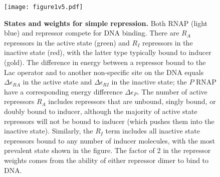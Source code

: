 \begin{figure}[h]
	\centering \texttt{[image: figure1v5.pdf]}
	\caption{{\bf States and weights for simple repression. } Both RNAP (light blue)
		and repressor compete for DNA binding. There are $R_A$ repressors in the active
		state (green) and $R_I$ repressors in the inactive state (red), with the latter
		type typically bound to inducer (gold). The difference in energy between a
		repressor bound to the Lac operator and to another non-specific site on the DNA
		equals $\Delta\epsilon_{RA}$ in the active state and $\Delta\epsilon_{RI}$
		in the inactive state; the $P$ RNAP have a corresponding energy difference
		$\Delta\epsilon_{P}$. The number of active repressors $R_A$ includes
		repressors that are unbound, singly bound, or doubly bound to inducer, although
		the majority of active state repressors will not be bound to inducer (which
		pushes them into the inactive state). Similarly, the $R_I$ term includes all
		inactive state repressors bound to any number of inducer molecules, with the
		most prevalent state shown in the figure. The factor of 2 in the repressor
		weights comes from the ability of either repressor dimer to bind to DNA.}
	\label{figpolymeraseRepressorStates}
\end{figure}



